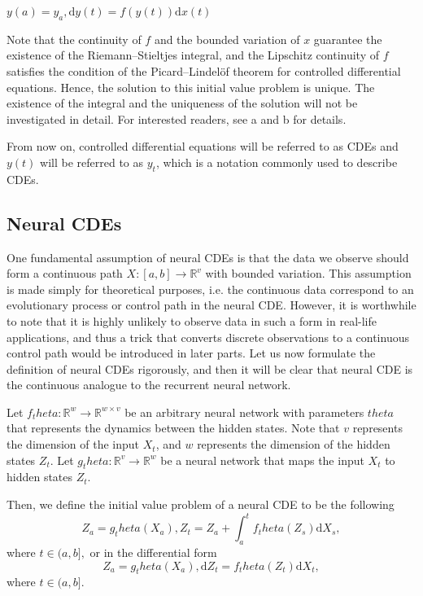 \documentclass[a4paper,11pt,titlepage]{article}
\def\theta{theta}%
\theoremstyle{definition}
\theoremstyle{plain}
\theoremstyle{remark}
\begin{document}
\begin{center}
    $y(a)=y_a, \mathrm{d}y(t) = f(y(t))\mathrm{d}x(t)$
\end{center}

Note that the continuity of $f$ and the bounded variation of $x$ guarantee the existence of the Riemann–Stieltjes integral, and the Lipschitz continuity of $f$ satisfies the condition of the Picard–Lindelöf theorem for controlled differential equations. Hence, the solution to this initial value problem is unique. The existence of the integral and the uniqueness of the solution will not be investigated in detail. For interested readers, see a and b for details.

From now on, controlled differential equations will be referred to as CDEs and $y(t)$ will be referred to as $y_t$, which is a notation commonly used to describe CDEs.

\subsection{Neural CDEs}

One fundamental assumption of neural CDEs is that the data we observe should form a continuous path $X:[a,b]\rightarrow\mathbb{R}^v$ with bounded variation. This assumption is made simply for theoretical purposes, i.e. the continuous data correspond to an evolutionary process or control path in the neural CDE. However, it is worthwhile to note that it is highly unlikely to observe data in such a form in real-life applications, and thus a trick that converts discrete observations to a continuous control path would be introduced in later parts. Let us now formulate the definition of neural CDEs rigorously, and then it will be clear that neural CDE is the continuous analogue to the recurrent neural network.

Let $f_\theta:\mathbb{R}^w\rightarrow\mathbb{R}^{w\times v}$ be an arbitrary neural network with parameters $\theta$ that represents the dynamics between the hidden states. Note that $v$ represents the dimension of the input $X_t$, and $w$ represents the dimension of the hidden states $Z_t$. Let $g_\theta:\mathbb{R}^v\rightarrow\mathbb{R}^w$ be a neural network that maps the input $X_t$ to hidden states $Z_t$.

Then, we define the initial value problem of a neural CDE to be the following
$$Z_a=g_\theta(X_a), Z_t=Z_a+\int_a^tf_\theta(Z_s)\mathrm{d}X_s,$$ where $t\in(a,b],$
or in the differential form
$$Z_a=g_\theta(X_a), \mathrm{d}Z_t=f_\theta(Z_t)\mathrm{d}X_t,$$ where $t\in(a,b].$
\end{document}
